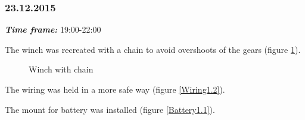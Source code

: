 \subsubsection{23.12.2015}
\textit{\textbf{Time frame:}} 19:00-22:00

The winch was recreated with a chain to avoid overshoots of the gears (figure \ref{Winch2.7}).

\begin{figure}[H]
	\begin{minipage}[h]{1\linewidth}
		\caption{Winch with chain}
		\label{Winch2.7}
	\end{minipage}
\end{figure}

The wiring was held in a more safe way (figure \ref{Wiring1.2}).

The mount for battery was installed (figure \ref{Battery1.1}).

